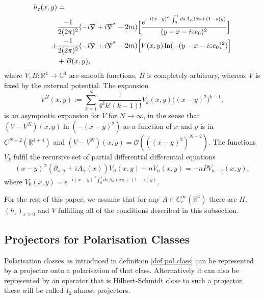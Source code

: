 \documentclass[b5paper,draft,openbib,12pt]{memoir}
\begin{document}
\begin{align}\nonumber
h_\varepsilon (x,y)&=\\\label{eq:hadamardexp1}
&\frac{-1}{2(2\pi)^2}(-i \slashed{\nabla} + i \slashed{\nabla}^\ast -2m)\Big[\frac{e^{-i (x-y)^\alpha\int_0^1 ds A_\alpha (x s + (1-s)y)}}{ (y-x-i \varepsilon e_0)^2}\Big]\\\label{eq:hadamardexp2}
+&\frac{-1}{2(2\pi)^2}(-i \slashed{\nabla} + i \slashed{\nabla}^\ast -2m)\Big[ V(x,y) \ln (-(y-x-i \varepsilon e_0)^2)\Big]\\\label{eq:hadamardexp3}
&+B(x,y),
\end{align}
%
%
where \(V,B:\mathbb{R}^4\rightarrow \mathbb{C}^4\) are smooth functions, \(B\) is completely arbitrary, 
whereas \(V\) is fixed by the external potential. The expansion
\begin{equation}
V^N(x,y):=\sum_{k=1}^N \frac{1}{ 4^{k} k!(k-1)!} V_k(x,y) \big((x-y)^2\big)^{k-1},
\end{equation}
is an asymptotic expansion for \(V\) for 
\(N\rightarrow \infty\), in the sense that
\((V-V^N)(x,y)\ln(-(x-y)^2)\) as a function of \(x\) and 
\(y\) is in \(C^{N-2}(\mathbb{R}^{4+4})\)
and \((V-V^N)(x,y)=\mathcal{O}\left(\left((x-y)^{2}\right)^{N-2}\right)\).
The functions \(V_k\) fulfil the recursive set of partial 
differential differential equations
\begin{align}\label{Hadamard recursive equ.}
(x-y)^\alpha (\partial_{x,\alpha}+i A_\alpha(x)) V_{n}(x,y) + n V_{n}(x,y)=-n P V_{n-1}(x,y),
\end{align}
where \(V_{0}(x,y)=e^{-i (x-y)^\alpha\int_0^1 ds A_\alpha (x s + (1-s)y)}\). 

For the rest of this paper, we assume that for any \(A\in C_c^\infty(\mathbb{R}^4)\) there are \(H\), \((h_\varepsilon)_{\varepsilon>0}\) and \(V\)
fulfilling all of the conditions described in this subsection.
 

\subsection{Projectors for Polarisation Classes}\label{sec:pol classes}

Polarisation classes as introduced in 
definition \ref{def pol class} can be represented by 
a projector onto a polarisation of that class. 
Alternatively it can also be represented by 
an operator that is Hilbert-Schmidt close to 
such a projector, these will be called 
\(I_2\)-almost projectors. 
\end{document}

